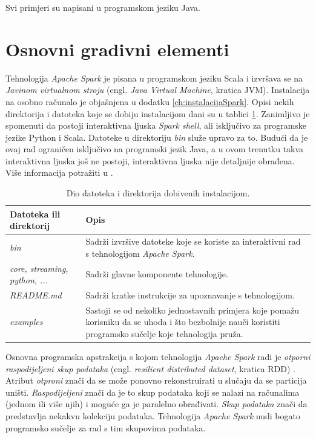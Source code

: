 \documentclass[times, utf8, zavrsni, numeric]{fer}
\begin{document}
Svi primjeri su napisani u programskom jeziku Java.

\section{Osnovni gradivni elementi}
Tehnologija \emph{Apache Spark} je pisana u programskom jeziku Scala i izvršava se na \emph{Javinom virtualnom stroju} (engl. \emph{Java Virtual Machine}, kratica JVM). Instalacija na osobno računalo je objašnjena u dodatku \ref{ch:instalacijaSpark}. Opisi nekih direktorija i datoteka koje se dobiju instalacijom dani su u tablici \ref{tbl:installPackage}. Zanimljivo je spomenuti da postoji interaktivna ljuska \emph{Spark shell}, ali isključivo za programske jezike Python i Scala. Datoteke u direktoriju \emph{bin} služe upravo za to. Budući da je ovaj rad ograničen isključivo na programski jezik Java, a u ovom trenutku takva interaktivna ljuska još ne postoji, interaktivna ljuska nije detaljnije obrađena. Više informacija potražiti u \cite{learningSpark}.

\begin{table}[htb]
\caption{Dio datoteka i direktorija dobivenih instalacijom.}
\label{tbl:installPackage}
\centering
\begin{tabular}{l p{8cm}}
\hline
Datoteka ili direktorij & Opis \\
\hline
\emph{bin} & Sadrži izvršive datoteke koje se koriste za interaktivni rad s tehnologijom \emph{Apache Spark}.\\
\emph{core, streaming, python, ...} & Sadrži glavne komponente tehnologije. \\
\emph{README.md} & Sadrži kratke instrukcije za upoznavanje s tehnologijom.\\
\emph{examples} & Sastoji se od nekoliko jednostavnih primjera koje pomažu korisniku da se uhoda i što bezbolnije nauči koristiti programsko sučelje koje tehnologija pruža. \\
\hline
\end{tabular}
\end{table}

Osnovna programska apstrakcija s kojom tehnologija \emph{Apache Spark} radi je \emph{otporni raspodijeljeni skup podataka} (engl. \emph{resilient distributed dataset}, kratica RDD) \cite{workingSets}.
Atribut \emph{otproni} znači da se može ponovno rekonstruirati u slučaju da se particija uništi. \emph{Raspodijeljeni} znači da je to skup podataka koji se nalazi na računalima (jednom ili više njih) i moguće ga je paralelno obrađivati. \emph{Skup podataka} znači da predstavlja nekakvu kolekciju podataka. Tehnologija \emph{Apache Spark} nudi bogato programsko sučelje za rad s tim skupovima podataka.
\end{document}
